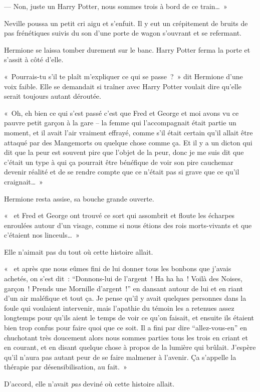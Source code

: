 --- Non, juste un Harry Potter, nous sommes trois à bord de ce train…~»

Neville poussa un petit cri aigu et s'enfuit. Il y eut un crépitement de bruits de pas frénétiques suivis du son d'une porte de wagon s'ouvrant et se refermant.

Hermione se laissa tomber durement sur le banc. Harry Potter ferma la porte et s'assit à côté d'elle.

«~Pourrais-tu s'il te plaît m'expliquer ce qui se passe~?~» dit Hermione d'une voix faible. Elle se demandait si traîner avec Harry Potter voulait dire qu'elle serait toujours autant déroutée.

«~Oh, eh bien ce qui s'est passé c'est que Fred et George et moi avons vu ce pauvre petit garçon à la gare -- la femme qui l'accompagnait était partie un moment, et il avait l'air vraiment effrayé, comme s'il était certain qu'il allait être attaqué par des Mangemorts ou quelque chose comme ça. Et il y a un dicton qui dit que la peur est souvent pire que l'objet de la peur, donc je me suis dit que c'était un type à qui ça pourrait être bénéfique de voir son pire cauchemar devenir réalité et de se rendre compte que ce n'était pas si grave que ce qu'il craignait…~»

Hermione resta assise, sa bouche grande ouverte.

«~ et Fred et George ont trouvé ce sort qui assombrit et floute les écharpes enroulées autour d'un visage, comme si nous étions des rois morts-vivants et que c'étaient nos linceuls…~»

Elle n'aimait pas du tout où cette histoire allait.

«~ et après que nous eûmes fini de lui donner tous les bonbons que j'avais achetés, on s'est dit~: “Donnons-lui de l'argent~! Ha ha ha~! Voilà des Noises, garçon~! Prends une Mornille d'argent~!” en dansant autour de lui et en riant d'un air maléfique et tout ça. Je pense qu'il y avait quelques personnes dans la foule qui voulaient intervenir, mais l'apathie du témoin les a retenues assez longtemps pour qu'ils aient le temps de voir ce qu'on faisait, et ensuite ils étaient bien trop confus pour faire quoi que ce soit. Il a fini par dire “allez-vous-en” en chuchotant très doucement alors nous sommes parties tous les trois en criant et en courant, et en disant quelque chose à propos de la lumière qui brûlait. J'espère qu'il n'aura pas autant peur de se faire malmener à l'avenir. Ça s'appelle la thérapie par désensibilisation, au fait.~»

D'accord, elle n'avait \emph{pas} deviné où cette histoire allait.

